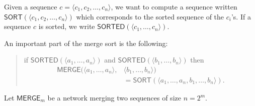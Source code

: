 \documentclass[./main]{subfiles}
\begin{document}
  Given a sequence $c = \langle c_1, c_2, \ldots, c_n \rangle$, we want to compute a sequence written $\mathsf{SORT}(\langle c_1, c_2, \ldots, c_n \rangle)$ which corresponds to the sorted sequence of the $c_i$'s.
  If a sequence $c$ is sorted, we write $\mathsf{SORTED}(\langle c_1, \ldots, c_n \rangle)$.
  
  An important part of the merge sort is the following:
  \begin{quote}
    if $\mathsf{SORTED}(\langle a_1, \ldots, a_n \rangle)$
    and $\mathsf{SORTED}(\langle b_1, \ldots, b_n \rangle)$
    then
    \begin{align*}
      \mathsf{MERGE}(\langle a_1, \ldots, a_n \rangle, &\langle b_1, \ldots, b_n \rangle)\\
    &= \mathsf{SORT}(\langle a_1, \ldots, a_n, b_1, \ldots, b_n \rangle)
    .\end{align*}
  \end{quote}

  Let $\mathsf{MERGE}_m$ be a network merging two sequences of size $n = 2^m$.


\end{document}
